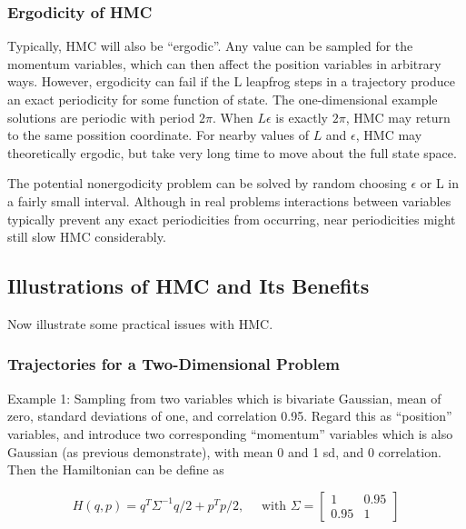 \documentclass[
]{book}
\theoremstyle{definition}
\theoremstyle{definition}
\theoremstyle{definition}
\theoremstyle{remark}
\begin{document}
\hypertarget{ergodicity-of-hmc}{%
\subsubsection{Ergodicity of HMC}\label{ergodicity-of-hmc}}

Typically, HMC will also be ``ergodic''. Any value can be sampled for the momentum variables, which can then affect the position variables in arbitrary ways.
However, ergodicity can fail if the L leapfrog steps in a trajectory produce an exact periodicity for some function of state. The one-dimensional example solutions are periodic with period \(2\pi\). When \(L\epsilon\) is exactly \(2\pi\), HMC may return to the same possition coordinate.
For nearby values of \(L\) and \(\epsilon\), HMC may theoretically ergodic, but take very long time to move about the full state space.

The potential nonergodicity problem can be solved by random choosing \(\epsilon\) or L in a fairly small interval. Although in real problems interactions between variables typically prevent any exact periodicities from occurring, near periodicities might still slow HMC considerably.

\hypertarget{illustrations-of-hmc-and-its-benefits}{%
\subsection{Illustrations of HMC and Its Benefits}\label{illustrations-of-hmc-and-its-benefits}}

Now illustrate some practical issues with HMC.

\hypertarget{trajectories-for-a-two-dimensional-problem}{%
\subsubsection{Trajectories for a Two-Dimensional Problem}\label{trajectories-for-a-two-dimensional-problem}}

Example 1: Sampling from two variables which is bivariate Gaussian, mean of zero, standard deviations of one, and correlation 0.95. Regard this as ``position'' variables, and introduce two corresponding ``momentum'' variables which is also Gaussian (as previous demonstrate), with mean 0 and 1 sd, and 0 correlation. Then the Hamiltonian can be define as

\[
H(q, p)=q^{T} \Sigma^{-1} q / 2+p^{T} p / 2, \quad \text { with } \Sigma=\left[ \begin{array}{cc}{1} & {0.95} \\ {0.95} & {1}\end{array}\right]
\]
\end{document}
